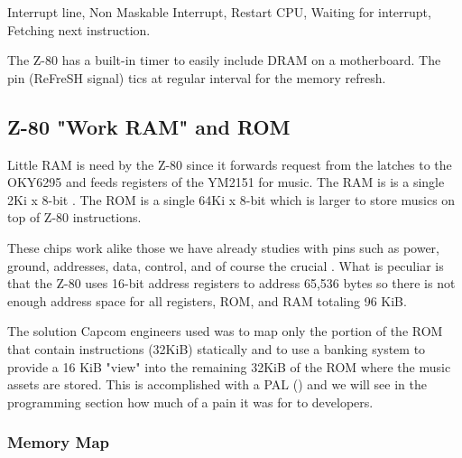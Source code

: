  Interrupt line,  Non Maskable Interrupt,  Restart CPU,  Waiting for interrupt,  Fetching next instruction.

\begin{trivia}
 The Z-80 has a built-in timer to easily include DRAM on a motherboard. The  pin (ReFreSH signal) tics at regular interval for the memory refresh.
\end{trivia}

\subsection{Z-80 "Work RAM" and ROM}
Little RAM is need by the Z-80 since it forwards request from the latches to the OKY6295 and feeds registers  of the YM2151 for music. The RAM is is a single 2Ki x 8-bit . The ROM is a single 64Ki x 8-bit  which is larger to store musics on top of Z-80 instructions. 



These chips work alike those we have already studies with pins such as power, ground, addresses, data, control, and of course the crucial . What is peculiar is that the Z-80 uses 16-bit address registers to address 65,536 bytes so there is not enough address space for all registers, ROM, and RAM totaling 96 KiB.

The solution Capcom engineers used was to map only the portion of the ROM that contain instructions (32KiB) statically and to use a banking system to provide a 16 KiB "view" into the remaining 32KiB of the ROM where the music assets are stored. This is accomplished with a PAL () and we will see in the programming section how much of a pain it was for to developers.



\subsubsection{Memory Map}

